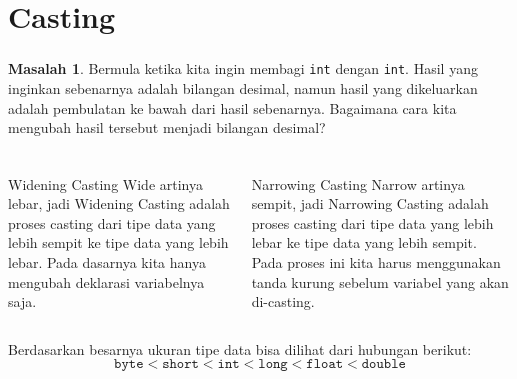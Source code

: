 \documentclass[aspectratio=169]{beamer}
\newtheorem*{definisi}{Definisi}
\theoremstyle{definition}
\newtheorem*{masalah}{Masalah}
\begin{document}
    \section{Casting}
    \begin{frame}
        \frametitle{\insertsection}
        \begin{masalah}
            Bermula ketika kita ingin membagi \texttt{int} dengan \texttt{int}. Hasil yang inginkan sebenarnya adalah bilangan desimal, namun hasil yang dikeluarkan adalah pembulatan ke bawah dari hasil sebenarnya. Bagaimana cara kita mengubah hasil tersebut menjadi bilangan desimal?
        \end{masalah}
    \end{frame}

    \begin{frame}
        \frametitle{\insertsection}
        \begin{columns}
            \begin{column}{0.45\textwidth}
                \begin{block}{Widening Casting}
                    Wide artinya lebar, jadi Widening Casting adalah proses casting dari tipe data yang lebih sempit ke tipe data yang lebih lebar. Pada dasarnya kita hanya mengubah deklarasi variabelnya saja.
                \end{block}
            \end{column}
            \begin{column}{0.45\textwidth}
                \begin{block}{Narrowing Casting}
                    Narrow artinya sempit, jadi Narrowing Casting adalah proses casting dari tipe data yang lebih lebar ke tipe data yang lebih sempit. Pada proses ini kita harus menggunakan tanda kurung sebelum variabel yang akan di-casting.
                \end{block}
            \end{column}
        \end{columns}
        \vspace*{0.5cm}
        Berdasarkan besarnya ukuran tipe data bisa dilihat dari hubungan berikut:
        \[\texttt{byte} < \texttt{short} < \texttt{int} < \texttt{long} < \texttt{float} < \texttt{double}\]
    \end{frame}
\end{document}
